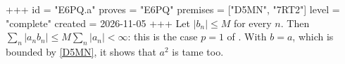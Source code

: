 +++
id = "E6PQ.a"
proves = "E6PQ"
premises = ["D5MN", "7RT2"]
level = "complete"
created = 2026-11-05
+++
Let $|b_n| \le M$ for every $n$. Then $\sum_n |a_n b_n| \le M \sum_n |a_n| < \infty$: this is the case $p = 1$ of . With $b = a$, which is bounded by \ref{D5MN}, it shows that $a^2$ is tame too.
